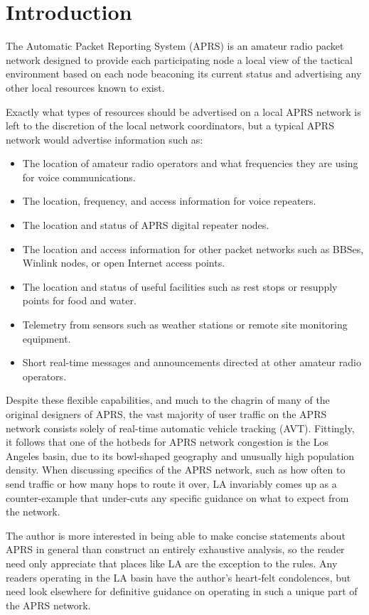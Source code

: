 

\chapter{Introduction}

The Automatic Packet Reporting System (APRS) is an amateur radio packet
network designed to provide each participating node a local view of the 
tactical environment based on each node beaconing its current status
and advertising any other local resources known to exist.

Exactly what types of resources should be advertised on a local APRS
network is left to the discretion of the local network coordinators, but
a typical APRS network would advertise information such as:
\begin{itemize}
\item The location of amateur radio operators and what frequencies they are using for voice communications.
\item The location, frequency, and access information for voice repeaters.
\item The location and status of APRS digital repeater nodes.
\item The location and access information for other packet networks such as BBSes, Winlink nodes, or open Internet access points.
\item The location and status of useful facilities such as rest stops or resupply points for food and water.
\item Telemetry from sensors such as weather stations or remote site monitoring equipment.
\item Short real-time messages and announcements directed at other amateur radio operators.
\end{itemize} 

Despite these flexible capabilities, 
and much to the chagrin of many of the original designers of APRS, 
the vast majority of user traffic on the APRS network consists solely of 
real-time automatic vehicle tracking (AVT).
Fittingly, it follows that one of the hotbeds for APRS network congestion
is the Los Angeles basin, 
due to its bowl-shaped geography and unusually high population density. \cite{bobfixla}
When discussing specifics of the APRS network, such as how often to send traffic
or how many hops to route it over, LA invariably comes up as a counter-example
that under-cuts any specific guidance on what to expect from the network.

The author is more interested in being able to make concise statements about 
APRS in general than construct an entirely exhaustive analysis, 
so the reader need only appreciate that places like LA are the exception to the rules.
Any readers operating in the LA basin have the author's heart-felt condolences,
but need look elsewhere for definitive guidance on operating in such a unique
part of the APRS network.

